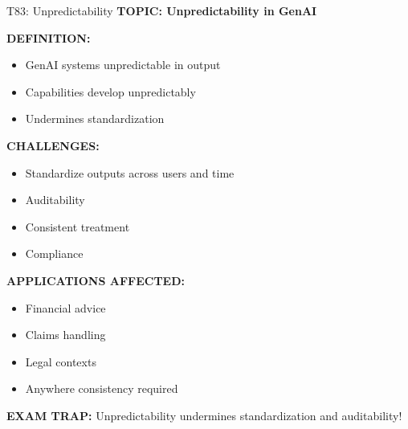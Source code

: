 \documentclass[8pt]{beamer}
\begin{document}
	\begin{frame}{T83: Unpredictability}
		\fontsize{6.5}{7.5}\selectfont
		\textbf{TOPIC: Unpredictability in GenAI}
		
		\vspace{0.1cm}
		\textbf{DEFINITION:}
		\begin{itemize}
			\item GenAI systems unpredictable in output
			\item Capabilities develop unpredictably
			\item Undermines standardization
		\end{itemize}
		
		\vspace{0.1cm}
		\textbf{CHALLENGES:}
		\begin{itemize}
			\item Standardize outputs across users and time
			\item Auditability
			\item Consistent treatment
			\item Compliance
		\end{itemize}
		
		\vspace{0.1cm}
		\textbf{APPLICATIONS AFFECTED:}
		\begin{itemize}
			\item Financial advice
			\item Claims handling
			\item Legal contexts
			\item Anywhere consistency required
		\end{itemize}
		
		\textcolor{myred}{\textbf{EXAM TRAP:}} Unpredictability undermines \textcolor{myblue}{standardization and auditability}!
	\end{frame}
	
\end{document}
